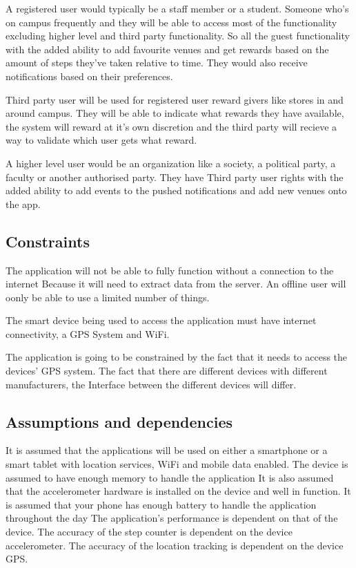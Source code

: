 \documentclass[11pt]{article}
\begin{document}
      A registered user would typically be a staff member or a student. Someone who’s on campus frequently and they will be 			able to access most of the functionality excluding higher level and third party functionality. So all the guest 			functionality with the added ability to add favourite venues and get rewards based on the amount of steps they’ve taken 		relative to time. They would also receive notifications based on their preferences.

      Third party user will be used for registered user reward givers like stores in and around campus. They will be able to 			indicate what rewards they have available, the system will reward at it’s own discretion and the third party will 			recieve a way to validate which user gets what reward.

      A higher level user would be an organization like a society, a political party, a faculty or another authorised party. 
      They have Third party user rights with the added ability to add events to the pushed notifications and add new venues 			onto the app.

      \subsection{Constraints}
      The application will not be able to fully function without a connection to the internet Because it will need to extract 		data from the server. An offline user will oonly be able to use a limited number of things.

      The smart device being used to access the application must have internet connectivity, a GPS 
      System and WiFi.

      The application is going to be constrained by the fact that it needs to access the devices’ 
      GPS system. The fact that there are different devices with different manufacturers, the Interface between the different 		devices will differ.

      \subsection{Assumptions and dependencies}
      It is assumed that the applications will be used on either a smartphone or a smart tablet with location services, WiFi 			and mobile data enabled.
      The device is assumed to have enough memory to handle the application
      It is also assumed that the accelerometer hardware is installed on the device and well in function.
      It is assumed that your phone has enough battery to handle the application throughout the day
      The application’s performance is dependent on that of the device.
      The accuracy of the step counter is dependent on the device accelerometer.
      The accuracy of the location tracking is dependent on the device GPS.
\end{document}
